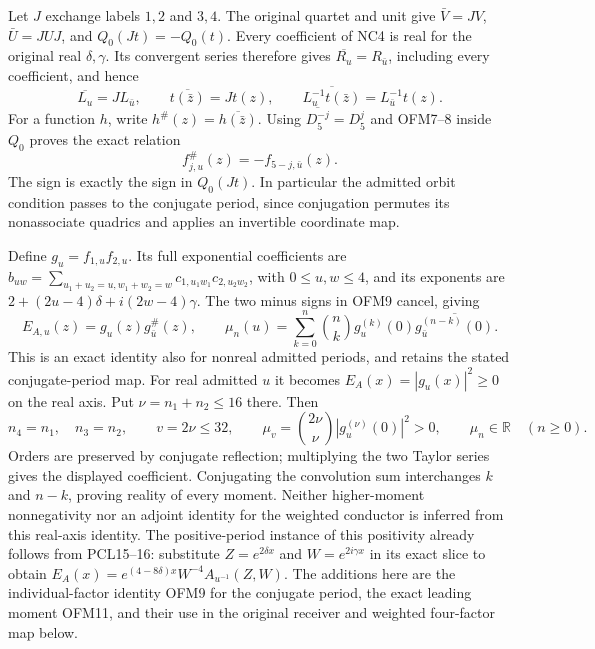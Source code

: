 \documentclass[11pt]{article}
\begin{document}
Let $J$ exchange labels $1,2$ and $3,4$. The original quartet and
unit give $\bar V=JV$, $\bar U=JUJ$, and $Q_0(Jt)=-Q_0(t)$.
Every coefficient of NC4 is real for the original real $\delta,\gamma$.
Its convergent series therefore gives
$\overline{R_u}=R_{\bar u}$, including every coefficient, and hence
\[
 \overline{L_u}=J L_{\bar u},\qquad
 \overline{t(\bar z)}=Jt(z),\qquad
 \overline{L_u^{-1}t(\bar z)}=L_{\bar u}^{-1}t(z).
 \tag{OFM8}
\]
For a function $h$, write $h^\#(z)=\overline{h(\bar z)}$.
Using $\overline{D_5^{-j}}=D_5^j$ and OFM7--8 inside $Q_0$
proves the exact relation
\[
 f_{j,u}^{\#}(z)=-f_{5-j,\bar u}(z).
 \tag{OFM9}
\]
The sign is exactly the sign in $Q_0(Jt)$. In particular the
admitted orbit condition passes to the conjugate period, since
conjugation permutes its nonassociate quadrics and applies an
invertible coordinate map.

Define $g_u=f_{1,u}f_{2,u}$. Its full exponential coefficients are
$b_{uw}=\sum_{u_1+u_2=u,w_1+w_2=w}c_{1,u_1w_1}c_{2,u_2w_2}$,
with $0\le u,w\le4$, and its exponents are
$2+(2u-4)\delta+i(2w-4)\gamma$. The two minus signs in OFM9
cancel, giving
\[
 E_{A,u}(z)=g_u(z)g_{\bar u}^{\#}(z),\qquad
 \mu_n(u)=\sum_{k=0}^n\binom nk
          g_u^{(k)}(0)\overline{g_{\bar u}^{(n-k)}(0)}.
 \tag{OFM10}
\]
This is an exact identity also for nonreal admitted periods, and
retains the stated conjugate-period map. For real admitted $u$ it
becomes $E_A(x)=|g_u(x)|^2\ge0$ on the real axis. Put
$\nu=n_1+n_2\le16$ there. Then
\[
 n_4=n_1,\quad n_3=n_2,\qquad
 v=2\nu\le32,\qquad
 \boxed{\mu_v=\binom{2\nu}{\nu}|g_u^{(\nu)}(0)|^2>0},
 \qquad \mu_n\in\mathbb R\quad(n\ge0).
 \tag{OFM11}
\]
Orders are preserved by conjugate reflection; multiplying the two
Taylor series gives the displayed coefficient. Conjugating the
convolution sum interchanges $k$ and $n-k$, proving reality of every
moment. Neither higher-moment nonnegativity nor an adjoint identity
for the weighted conductor is inferred from this real-axis identity.
The positive-period instance of this positivity already follows from
PCL15--16: substitute $Z=e^{2\delta x}$ and $W=e^{2i\gamma x}$
in its exact slice to obtain
$E_A(x)=e^{(4-8\delta)x}W^{-4}A_{u^{-1}}(Z,W)$.
The additions here are the individual-factor identity OFM9 for the
conjugate period, the exact leading moment OFM11, and their use in
the original receiver and weighted four-factor map below.
\end{document}
